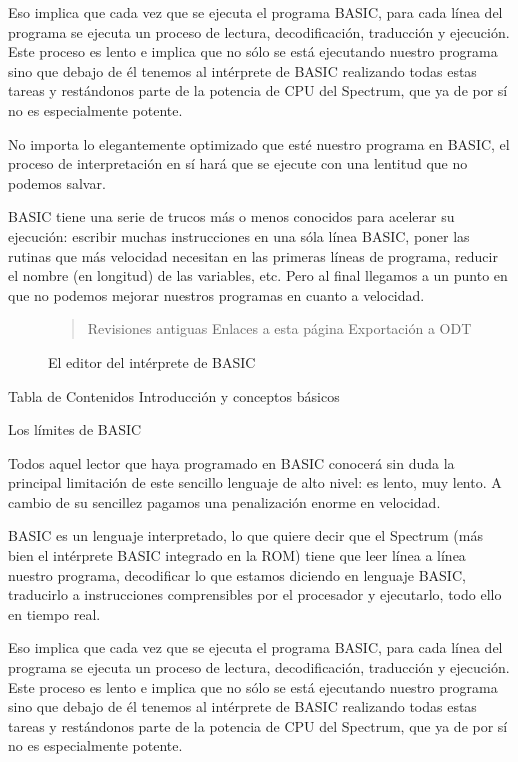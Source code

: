 \documentclass[letterpaper,10pt,spanish]{sphinxmanual}
\begin{document}
Eso implica que cada vez que se ejecuta el programa BASIC, para cada línea del programa se ejecuta un proceso de lectura, decodificación, traducción y ejecución. Este proceso es lento e implica que no sólo se está ejecutando nuestro programa sino que debajo de él tenemos al intérprete de BASIC realizando todas estas tareas y restándonos parte de la potencia de CPU del Spectrum, que ya de por sí no es especialmente potente.

No importa lo elegantemente optimizado que esté nuestro programa en BASIC, el proceso de interpretación en sí hará que se ejecute con una lentitud que no podemos salvar.

BASIC tiene una serie de trucos más o menos conocidos para acelerar su ejecución: escribir muchas instrucciones en una sóla línea BASIC, poner las rutinas que más velocidad necesitan en las primeras líneas de programa, reducir el nombre (en longitud) de las variables, etc. Pero al final llegamos a un punto en que no podemos mejorar nuestros programas en cuanto a velocidad.

\begin{figure}[htbp]
\centering
\capstart

\noindent{}
\caption{El editor del intérprete de BASIC}\label{\detokenize{02_introduccion/introduccion:id1}}
\begin{sphinxlegend}\begin{quote}

Revisiones antiguas
Enlaces a esta página
Exportación a ODT
\end{quote}
\end{sphinxlegend}
\end{figure}

Tabla de Contenidos
Introducción y conceptos básicos

Los límites de BASIC

Todos aquel lector que haya programado en BASIC conocerá sin duda la principal limitación de este sencillo lenguaje de alto nivel: es lento, muy lento. A cambio de su sencillez pagamos una penalización enorme en velocidad.

BASIC es un lenguaje interpretado, lo que quiere decir que el Spectrum (más bien el intérprete BASIC integrado en la ROM) tiene que leer línea a línea nuestro programa, decodificar lo que estamos diciendo en lenguaje BASIC, traducirlo a instrucciones comprensibles por el procesador y ejecutarlo, todo ello en tiempo real.

Eso implica que cada vez que se ejecuta el programa BASIC, para cada línea del programa se ejecuta un proceso de lectura, decodificación, traducción y ejecución. Este proceso es lento e implica que no sólo se está ejecutando nuestro programa sino que debajo de él tenemos al intérprete de BASIC realizando todas estas tareas y restándonos parte de la potencia de CPU del Spectrum, que ya de por sí no es especialmente potente.
\end{document}
